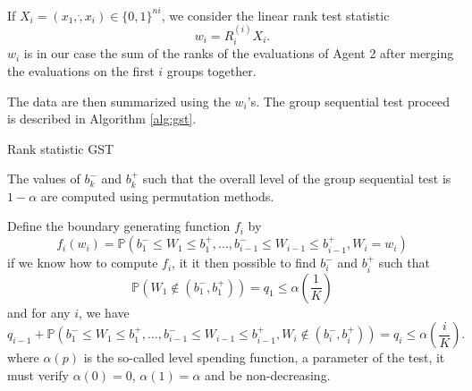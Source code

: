 \documentclass{article}
\theoremstyle{plain}
\theoremstyle{remark}
\renewcommand{\P}{\mathbb{P}}
\newcommand{\1}{\mathbbm{1}}
\numberwithin{equation}{section}
\begin{document}
If $X_i=(x_1,\dot,x_i)\in \{0,1\}^{ni}$, we consider the linear rank test statistic
$$w_i=R_i^{(i)}X_i.$$
$w_i$ is in our case the sum of the ranks of the evaluations of Agent 2 after merging the evaluations on the first $i$ groups together.

The data are then summarized using the $w_i$'s. The group sequential test proceed is described in Algorithm \ref{alg:gst}.
\begin{algorithm}[h]
\SetAlgoLined
{}
\caption{Rank statistic GST}\label{alg:gst}
\end{algorithm}

The values of $b_k^-$ and $b_k^+$ such that the overall level of the group sequential test is $1-\alpha$ are computed using permutation methods.

Define the boundary generating function $f_i$ by 
$$f_i(w_i)=\P\left(b_1^-\le W_1\le b_1^+, \dots, b_{i-1}^-\le W_{i-1}\le b_{i-1}^+, W_i = w_i  \right)$$
if we know how to compute $f_i$, it it then possible to find $b_i^-$ and $b_i^+$ such that 
$$\P\left(W_1 \notin (b_1^-, b_1^+) \right)=q_1 \le \alpha\left(\frac{1}{K} \right) $$
and for any $i$, we have 
$$q_{i-1}+\P\left(b_1^-\le W_1\le b_1^+, \dots, b_{i-1}^-\le W_{i-1}\le b_{i-1}^+, W_i  \notin(b_i^-, b_i^+) \right)=q_i \le \alpha\left(\frac{i}{K} \right).$$
where $\alpha(p)$ is the so-called level spending function, a parameter of the test, it must verify $\alpha(0)=0$, $\alpha(1)=\alpha$ and be non-decreasing.
\end{document}
